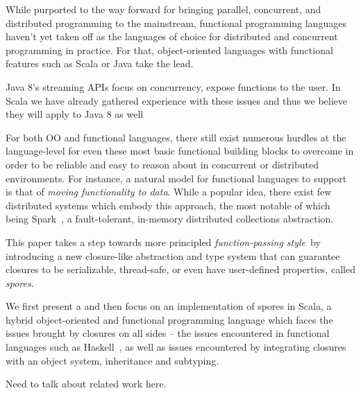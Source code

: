 \documentclass{llncs}
\begin{document}
While purported to the way forward for bringing parallel, concurrent, and
distributed programming to the mainstream, functional programming languages
haven't yet taken off as the languages of choice for distributed and
concurrent programming in practice. For that, object-oriented languages with functional features such as Scala or Java take the lead. 

Java 8's streaming APIs focus on concurrency, expose functions to the user.
In Scala we have already gathered experience with these issues and thus we
believe they will apply to Java 8 as well

For both OO and functional languages, there still exist numerous hurdles at
the language-level for even these most basic functional building blocks to
overcome in order to be reliable and easy to reason about in concurrent or
distributed environments. For instance, a natural model for
functional languages to support is that of {\em moving functionality to
data}. While a popular idea, there exist few distributed systems which embody
this approach, the most notable of which being Spark~\cite{Spark}, a fault-tolerant, 
in-memory distributed collections abstraction.


This paper takes a step towards more principled {\em function-passing
style}~by
introducing a new closure-like abstraction and type system that can guarantee
closures to be serializable, thread-safe, or even have user-defined
properties, called {\em spores}.

We first present a and then focus on an implementation of spores in Scala, a
hybrid object-oriented and functional programming language which faces the
issues brought by closures on all sides -- the issues encountered in
functional languages such as Haskell~\cite{CloudHaskell}, as well as issues
encountered by integrating closures with an object system, inheritance and
subtyping.

Need to talk about related work here.

\end{document}
